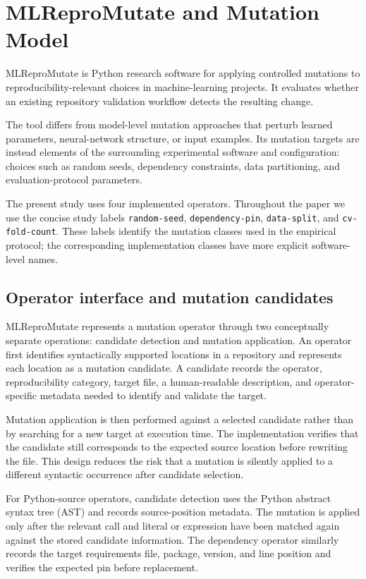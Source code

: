 \section{MLReproMutate and Mutation Model}
\label{sec:mlrepromutate}

MLReproMutate is Python research software for applying controlled
mutations to reproducibility-relevant choices in machine-learning projects. It
evaluates whether an existing repository validation workflow detects the
resulting change.

The tool differs from model-level mutation approaches that perturb learned
parameters, neural-network structure, or input examples. Its mutation targets
are instead elements of the surrounding experimental software and
configuration: choices such as random seeds, dependency constraints, data
partitioning, and evaluation-protocol parameters.

The present study uses four implemented operators. Throughout the paper we use
the concise study labels \texttt{random-seed}, \texttt{dependency-pin},
\texttt{data-split}, and \texttt{cv-fold-count}. These labels identify the
mutation classes used in the empirical protocol; the corresponding
implementation classes have more explicit software-level names.


\subsection{Operator interface and mutation candidates}
\label{sec:mlrepromutate-interface}

MLReproMutate represents a mutation operator through two conceptually separate
operations: candidate detection and mutation application. An operator first
identifies syntactically supported locations in a repository and represents
each location as a mutation candidate. A candidate records the operator,
reproducibility category, target file, a human-readable description, and
operator-specific metadata needed to identify and validate the target.

Mutation application is then performed against a selected candidate rather than
by searching for a new target at execution time. The implementation verifies
that the candidate still corresponds to the expected source location before
rewriting the file. This design reduces the risk that a mutation is silently
applied to a different syntactic occurrence after candidate selection.

For Python-source operators, candidate detection uses the Python abstract syntax
tree (AST) and records source-position metadata. The mutation is applied only
after the relevant call and literal or expression have been matched again
against the stored candidate information. The dependency operator similarly
records the target requirements file, package, version, and line position and
verifies the expected pin before replacement.


